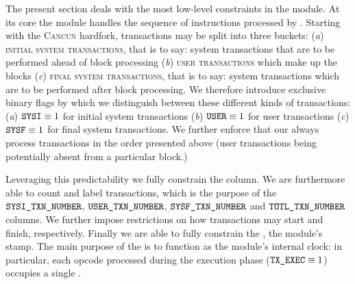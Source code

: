 The present section deals with the most low-level constraints in the \hubMod{} module.
At its core the \hubMod{} module handles the sequence of instructions processed by \linea{}.
Starting with the \textsc{Cancun} hardfork, \evm{} transactions may be split into three buckets:
(\emph{a}) \textsc{initial system transactions}, that is to say: system transactions that are to be performed ahead of block processing
(\emph{b}) \textsc{user transactions} which make up the blocks
(\emph{c}) \textsc{final system transactions}, that is to say: system transactions which are to be performed after block processing.
We therefore introduce exclusive binary flags by which we distinguish between these different kinds of transactions:
(\emph{a}) $\texttt{SYSI} \equiv 1$ for initial system transactions
(\emph{b}) $\texttt{USER} \equiv 1$ for user transactions
(\emph{c}) $\texttt{SYSF} \equiv 1$ for final system transactions.
We further enforce that our \zkEvm{} always process transactions in the order presented above
(user transactions being potentially absent from a particular block.)

Leveraging this predictability we fully constrain the \blockNumber{} column.
We are furthermore able to count and label transactions,
which is the purpose of the
$\texttt{SYSI}\texttt{\_}\texttt{TXN\_NUMBER}$,
$\texttt{USER}\texttt{\_}\texttt{TXN\_NUMBER}$,
$\texttt{SYSF}\texttt{\_}\texttt{TXN\_NUMBER}$ and
$\texttt{TOTL}\texttt{\_}\texttt{TXN\_NUMBER}$
columns.
We further impose restrictions on how transactions may start and finish, respectively.
Finally we are able to fully constrain the \hubStamp{}, the \hubMod{} module's stamp.
The main purpose of the \hubStamp{} is to function as the \hubMod{} module's internal clock:
in particular, each opcode processed during the execution phase ($\texttt{TX}\texttt{\_EXEC} \equiv 1$) occupies a single \hubStamp{}.
